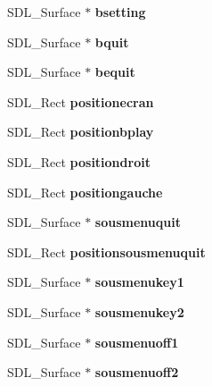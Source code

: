 \begin{DoxyCompactItemize}
S\+D\+L\+\_\+\+Surface $\ast$ {\bfseries bsetting}
\item 
\mbox{\label{structmenu_a08536c2303a8774b6f14bb48d2fd8a38}} 
S\+D\+L\+\_\+\+Surface $\ast$ {\bfseries bquit}
\item 
\mbox{\label{structmenu_a0273161cfcb4913b3730a2098bc9b61d}} 
S\+D\+L\+\_\+\+Surface $\ast$ {\bfseries bequit}
\item 
\mbox{\label{structmenu_addc595955e50e4d76ea81e30adbf1a00}} 
S\+D\+L\+\_\+\+Rect {\bfseries positionecran}
\item 
\mbox{\label{structmenu_a3ed8c92dbf426da82943a9b83b5bebd5}} 
S\+D\+L\+\_\+\+Rect {\bfseries positionbplay}
\item 
\mbox{\label{structmenu_afe9e96e10bfef62ed729af4e950e96e0}} 
S\+D\+L\+\_\+\+Rect {\bfseries positiondroit}
\item 
\mbox{\label{structmenu_a7bf3f5b262dff12ce28ac1db69bc5a22}} 
S\+D\+L\+\_\+\+Rect {\bfseries positiongauche}
\item 
\mbox{\label{structmenu_a9239f5f47587eafebaacab2d03696308}} 
S\+D\+L\+\_\+\+Surface $\ast$ {\bfseries sousmenuquit}
\item 
\mbox{\label{structmenu_abb4ed1db4bda8b600267aefbaab1be68}} 
S\+D\+L\+\_\+\+Rect {\bfseries positionsousmenuquit}
\item 
\mbox{\label{structmenu_a531457ab519190a0a9c2089f3e0078bb}} 
S\+D\+L\+\_\+\+Surface $\ast$ {\bfseries sousmenukey1}
\item 
\mbox{\label{structmenu_a53b73b1dad4ef0236fc2b63f36cd4579}} 
S\+D\+L\+\_\+\+Surface $\ast$ {\bfseries sousmenukey2}
\item 
\mbox{\label{structmenu_af0c7700fb99636175c01633fa42c9447}} 
S\+D\+L\+\_\+\+Surface $\ast$ {\bfseries sousmenuoff1}
\item 
\mbox{\label{structmenu_a52cef957987c8fb415a3db63240a972f}} 
S\+D\+L\+\_\+\+Surface $\ast$ {\bfseries sousmenuoff2}

\end{DoxyCompactItemize}
